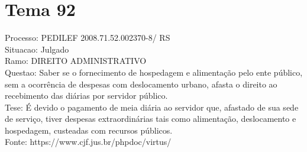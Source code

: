 \documentclass[12pt]{article}
\begin{document}
\section*{Tema 92}
Processo: PEDILEF 2008.71.52.002370-8/ RS\\
Situacao: Julgado\\
Ramo: DIREITO ADMINISTRATIVO\\
Questao: Saber se o fornecimento de hospedagem e alimentação pelo ente público, sem a ocorrência de despesas com deslocamento urbano, afasta o direito ao recebimento das diárias por servidor público.\\
Tese: É devido o pagamento de meia diária ao servidor que, afastado de sua sede de serviço, tiver despesas extraordinárias tais como alimentação, deslocamento e hospedagem, custeadas com recursos públicos.\\
Fonte: https://www.cjf.jus.br/phpdoc/virtus/
\end{document}
